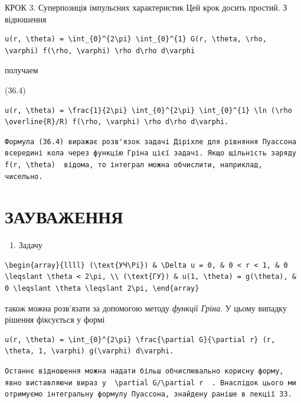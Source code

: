 \documentclass[
  ukrainian,
]{article}
\providecommand{\tightlist}{%
  \setlength{\itemsep}{0pt}\setlength{\parskip}{0pt}}
\begin{document}
КРОК 3. Суперпозиція імпульсних характеристик Цей крок досить простий. З
відношення

\begin{verbatim}
u(r, \theta) = \int_{0}^{2\pi} \int_{0}^{1} G(r, \theta, \rho, \varphi) f(\rho, \varphi) \rho d\rho d\varphi
\end{verbatim}

получаем

(36.4)

\begin{verbatim}
u(r, \theta) = \frac{1}{2\pi} \int_{0}^{2\pi} \int_{0}^{1} \ln (\rho \overline{R}/R) f(\rho, \varphi) \rho d\rho d\varphi.
\end{verbatim}

\begin{verbatim}
Формула (36.4) виражає розв'язок задачі Діріхле для рівняння Пуассона всередині кола через функцію Гріна цієї задачі. Якщо щільність заряду  f(r, \theta)  відома, то інтеграл можна обчислити, наприклад, чисельно.
\end{verbatim}

\section{ЗАУВАЖЕННЯ}\label{ux437ux430ux443ux432ux430ux436ux435ux43dux43dux44f-3}

\begin{enumerate}
\def\labelenumi{\arabic{enumi}.}
\tightlist
\item
  Задачу
\end{enumerate}

\begin{verbatim}
\begin{array}{llll} (\text{УЧ\Pi}) & \Delta u = 0, & 0 < r < 1, & 0 \leqslant \theta < 2\pi, \\ (\text{ГУ}) & u(1, \theta) = g(\theta), & 0 \leqslant \theta \leqslant 2\pi, \end{array}
\end{verbatim}

також можна розв'язати за допомогою методу \emph{функції Гріна}. У цьому
випадку рішення фіксується у формі

\begin{verbatim}
u(r, \theta) = \int_{0}^{2\pi} \frac{\partial G}{\partial r} (r, \theta, 1, \varphi) g(\varphi) d\varphi.
\end{verbatim}

\begin{verbatim}
Останнє відношення можна надати більш обчислювально корисну форму, явно виставляючи вираз у  \partial G/\partial r  . Внаслідок цього ми отримуємо інтегральну формулу Пуассона, знайдену раніше в лекції 33.
\end{verbatim}
\end{document}
